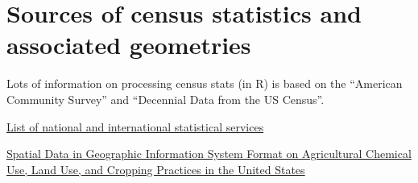 \documentclass[12pt,]{article}
\begin{document}
\hypertarget{sources-of-census-statistics-and-associated-geometries}{%
\section{Sources of census statistics and associated geometries}\label{sources-of-census-statistics-and-associated-geometries}}

Lots of information on processing census stats (in R) is based on the ``American Community Survey'' and ``Decennial Data from the US Census''.

\href{https://en.wikipedia.org/wiki/List_of_national_and_international_statistical_services}{List of national and international statistical services}

\href{https://pubs.usgs.gov/wri/wri944176/}{Spatial Data in Geographic Information System Format on Agricultural Chemical Use, Land Use, and Cropping Practices in the United States}
\end{document}
